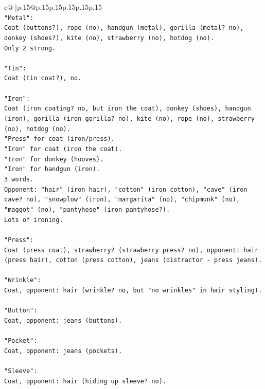 \documentclass{article}
\begin{document}
{\begin{supertabular}{c@{$\;$}|p{.15\linewidth}@{}p{.15\linewidth}p{.15\linewidth}p{.15\linewidth}p{.15\linewidth}p{.15\linewidth}}
{{{\\ 
\texttt{"Metal":} \\
\texttt{Coat (buttons?), rope (no), handgun (metal), gorilla (metal? no), donkey (shoes?), kite (no), strawberry (no), hotdog (no).} \\
\texttt{Only 2 strong.} \\
\\ 
\texttt{"Tin":} \\
\texttt{Coat (tin coat?), no.} \\
\\ 
\texttt{"Iron":} \\
\texttt{Coat (iron coating? no, but iron the coat), donkey (shoes), handgun (iron), gorilla (iron gorilla? no), kite (no), rope (no), strawberry (no), hotdog (no).} \\
\texttt{"Press" for coat (iron/press).} \\
\texttt{"Iron" for coat (iron the coat).} \\
\texttt{"Iron" for donkey (hooves).} \\
\texttt{"Iron" for handgun (iron).} \\
\texttt{3 words.} \\
\texttt{Opponent: "hair" (iron hair), "cotton" (iron cotton), "cave" (iron cave? no), "snowplow" (iron), "margarita" (no), "chipmunk" (no), "maggot" (no), "pantyhose" (iron pantyhose?).} \\
\texttt{Lots of ironing.} \\
\\ 
\texttt{"Press":} \\
\texttt{Coat (press coat), strawberry? (strawberry press? no), opponent: hair (press hair), cotton (press cotton), jeans (distractor {-} press jeans).} \\
\\ 
\texttt{"Wrinkle":} \\
\texttt{Coat, opponent: hair (wrinkle? no, but "no wrinkles" in hair styling).} \\
\\ 
\texttt{"Button":} \\
\texttt{Coat, opponent: jeans (buttons).} \\
\\ 
\texttt{"Pocket":} \\
\texttt{Coat, opponent: jeans (pockets).} \\
\\ 
\texttt{"Sleeve":} \\
\texttt{Coat, opponent: hair (hiding up sleeve? no).} \\
}}}
\end{supertabular}}
\end{document}
